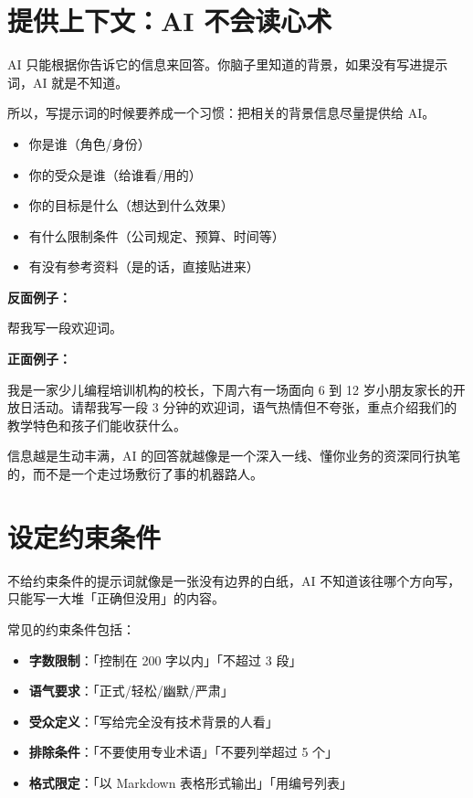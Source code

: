 \section{提供上下文：AI 不会读心术}

AI 只能根据你告诉它的信息来回答。你脑子里知道的背景，如果没有写进提示词，AI 就是不知道。

所以，写提示词的时候要养成一个习惯：把相关的背景信息尽量提供给 AI。

\begin{itemize}
  \item 你是谁（角色/身份）
  \item 你的受众是谁（给谁看/用的）
  \item 你的目标是什么（想达到什么效果）
  \item 有什么限制条件（公司规定、预算、时间等）
  \item 有没有参考资料（是的话，直接贴进来）
\end{itemize}

\textbf{反面例子：}
\begin{promptbox}
帮我写一段欢迎词。
\end{promptbox}

\textbf{正面例子：}
\begin{promptbox}
我是一家少儿编程培训机构的校长，下周六有一场面向 6 到 12 岁小朋友家长的开放日活动。请帮我写一段 3 分钟的欢迎词，语气热情但不夸张，重点介绍我们的教学特色和孩子们能收获什么。
\end{promptbox}

信息越是生动丰满，AI 的回答就越像是一个深入一线、懂你业务的资深同行执笔的，而不是一个走过场敷衍了事的机器路人。

\section{设定约束条件}

不给约束条件的提示词就像是一张没有边界的白纸，AI 不知道该往哪个方向写，只能写一大堆「正确但没用」的内容。

常见的约束条件包括：

\begin{itemize}
  \item \textbf{字数限制}：「控制在 200 字以内」「不超过 3 段」
  \item \textbf{语气要求}：「正式/轻松/幽默/严肃」
  \item \textbf{受众定义}：「写给完全没有技术背景的人看」
  \item \textbf{排除条件}：「不要使用专业术语」「不要列举超过 5 个」
  \item \textbf{格式限定}：「以 Markdown 表格形式输出」「用编号列表」
\end{itemize}

